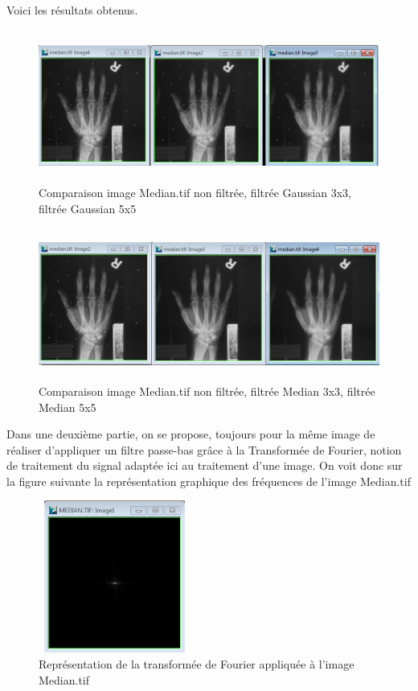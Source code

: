 \documentclass{scrreprt}
\begin{document}
Voici les résultats obtenus. 

\begin{figure}[!h]
\centering
\includegraphics[height=5cm,width=15cm]{images/gaussian.png}
\caption{Comparaison image Median.tif non filtrée, filtrée Gaussian 3x3, filtrée Gaussian 5x5}
\end{figure}

\newpage
\begin{figure}[!h]
\centering
\includegraphics[height=5cm,width=15cm]{images/median.png}
\caption{Comparaison image Median.tif non filtrée, filtrée Median 3x3, filtrée Median 5x5}
\end{figure}

Dans une deuxième partie, on se propose, toujours pour la même image de réaliser d'appliquer un filtre passe-bas
grâce à la Transformée de Fourier, notion de traitement du signal adaptée ici au traitement d'une image. 
On voit donc sur la figure suivante la représentation graphique des fréquences de l'image Median.tif 

\begin{figure}[!h]
\centering
\includegraphics[height=5cm,width=5cm]{images/tfmedian.png}
\caption{Représentation de la transformée de Fourier appliquée à l'image Median.tif}
\end{figure}
\end{document}
